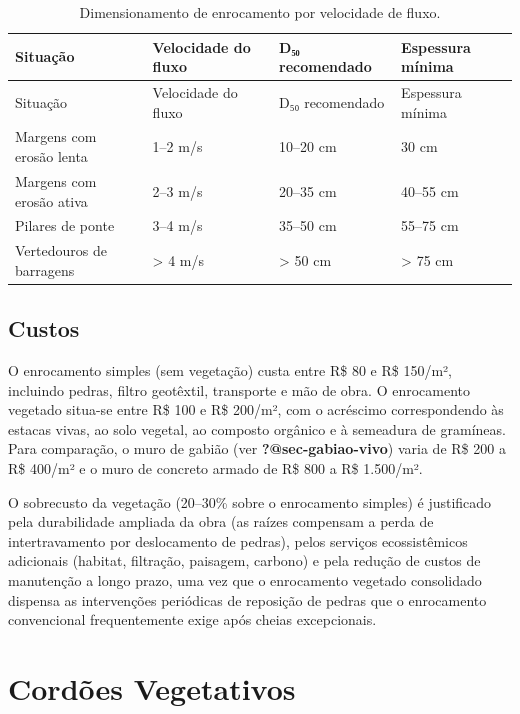 \documentclass[
  portuguese,
  11pt,
  a4paper,
  open=any]{scrbook}
\begin{document}
\begin{longtable}[]{@{}llll@{}}
\caption{Dimensionamento de enrocamento por velocidade de
fluxo.}\label{tbl-enrocamento}\tabularnewline
\toprule\noalign{}
Situação & Velocidade do fluxo & D₅₀ recomendado & Espessura mínima \\
\midrule\noalign{}
\endfirsthead
\toprule\noalign{}
Situação & Velocidade do fluxo & D₅₀ recomendado & Espessura mínima \\
\midrule\noalign{}
\endhead
\bottomrule\noalign{}
\endlastfoot
Margens com erosão lenta & 1--2 m/s & 10--20 cm & 30 cm \\
Margens com erosão ativa & 2--3 m/s & 20--35 cm & 40--55 cm \\
Pilares de ponte & 3--4 m/s & 35--50 cm & 55--75 cm \\
Vertedouros de barragens & \textgreater{} 4 m/s & \textgreater{} 50 cm &
\textgreater{} 75 cm \\
\end{longtable}

\section{Custos}\label{custos-3}

O enrocamento simples (sem vegetação) custa entre R\$ 80 e R\$ 150/m²,
incluindo pedras, filtro geotêxtil, transporte e mão de obra. O
enrocamento vegetado situa-se entre R\$ 100 e R\$ 200/m², com o
acréscimo correspondendo às estacas vivas, ao solo vegetal, ao composto
orgânico e à semeadura de gramíneas. Para comparação, o muro de gabião
(ver \textbf{?@sec-gabiao-vivo}) varia de R\$ 200 a R\$ 400/m² e o muro
de concreto armado de R\$ 800 a R\$ 1.500/m².

O sobrecusto da vegetação (20--30\% sobre o enrocamento simples) é
justificado pela durabilidade ampliada da obra (as raízes compensam a
perda de intertravamento por deslocamento de pedras), pelos serviços
ecossistêmicos adicionais (habitat, filtração, paisagem, carbono) e pela
redução de custos de manutenção a longo prazo, uma vez que o enrocamento
vegetado consolidado dispensa as intervenções periódicas de reposição de
pedras que o enrocamento convencional frequentemente exige após cheias
excepcionais.

\chapter{Cordões Vegetativos}\label{corduxf5es-vegetativos}
\end{document}
